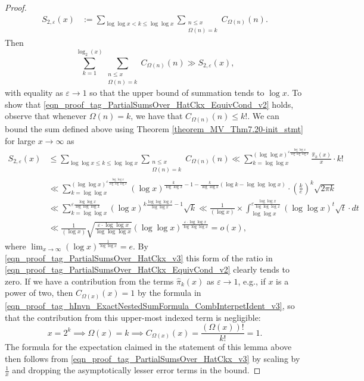 \documentclass[11pt,reqno,a4letter]{article}
\numberwithin{figure}{section}
\numberwithin{table}{section}
\theoremstyle{plain}
\numberwithin{theorem}{section}
\theoremstyle{definition}
\begin{document}
\begin{proof}
\begin{align*}
S_{2,\varepsilon}(x) & := \sum_{\log\log x < k \leq \log\log x} \sum_{\substack{n \leq x \\ \Omega(n) = k}} C_{\Omega(n)}(n). 
\end{align*} 
Then 
\[
\sum_{k=1}^{\log_2(x)} \sum_{\substack{n \leq x \\ \Omega(n) = k}} C_{\Omega(n)}(n) 
     \gg S_{2,\varepsilon}(x),  
\]
with equality as $\varepsilon \rightarrow 1$ so that the upper bound of summation tends to $\log x$. 
To show that \eqref{eqn_proof_tag_PartialSumsOver_HatCkx_EquivCond_v2} holds, 
observe that whenever $\Omega(n) = k$, we have that $C_{\Omega(n)}(n) \leq k!$. 
We can bound the sum defined above using 
Theorem \ref{theorem_MV_Thm7.20-init_stmt} for large $x \rightarrow \infty$ as 
\begin{align*} 
S_{2,\varepsilon}(x) & \leq 
     \sum_{\log\log x \leq k \leq \log\log x} \sum_{\substack{n \leq x \\ \Omega(n)=k}} C_{\Omega(n)}(n) 
     \ll \sum_{k=\log\log x}^{(\log\log x)^{\varepsilon \frac{\log\log x}{\log\log\log x}}} 
      \frac{\widehat{\pi}_k(x)}{x} \cdot k! \\ 
     & \ll \sum_{k=\log\log x}^{(\log\log x)^{\varepsilon \frac{\log\log x}{\log\log\log x}}} 
     (\log x)^{\frac{k}{\log\log x} - 1 - \frac{k}{\log\log x} \left( 
     \log k - \log\log\log x\right)} \cdot \left(\frac{k}{e}\right)^{k} \sqrt{2\pi k} \\ 
     & \ll \sum_{k=\log\log x}^{\varepsilon \frac{\log\log x}{\log\log\log x}} 
     (\log x)^{k \frac{\log\log\log x}{\log\log x} - 1} \sqrt{k} 
     \ll \frac{1}{(\log x)} \times \int_{\log\log x}^{\varepsilon 
     \frac{\log\log x}{\log\log\log x}} (\log\log x)^t \sqrt{t} \cdot dt \\ 
     & \ll \frac{1}{(\log x)} \sqrt{\frac{\varepsilon \cdot \log\log x}{\log\log\log x}} 
     (\log\log x)^{\frac{\varepsilon \cdot \log\log x}{\log\log\log x}} = o(x), 
\end{align*} 
where $\lim_{x \rightarrow \infty} (\log x)^{\frac{1}{\log\log x}} = e$. 
By \eqref{eqn_proof_tag_PartialSumsOver_HatCkx_v3} this 
form of the ratio in \eqref{eqn_proof_tag_PartialSumsOver_HatCkx_EquivCond_v2} clearly tends to zero. 
If we have a contribution from the terms $\widehat{\pi}_k(x)$ as $\varepsilon \rightarrow 1$, 
e.g., if $x$ is a power of two, then $C_{\Omega(x)}(x) = 1$ by the formula in 
\eqref{eqn_proof_tag_hInvn_ExactNestedSumFormula_CombInterpetIdent_v3}, so that 
the contribution from this upper-most indexed term is negligible: 
\[
x=2^k \implies \Omega(x) = k \implies C_{\Omega(x)}(x) = \frac{(\Omega(x))!}{k!} = 1. 
\]
The formula for the expectation claimed in the statement of this lemma above then 
follows from \eqref{eqn_proof_tag_PartialSumsOver_HatCkx_v3} by scaling by 
$\frac{1}{x}$ and dropping the asymptotically lesser error terms in the bound. 
\end{proof} 
\end{document}
